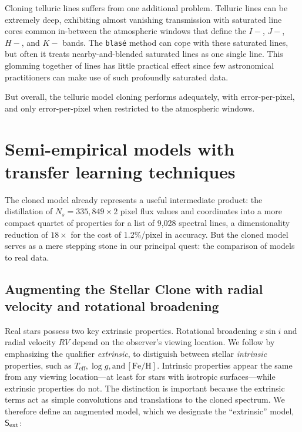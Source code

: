 \documentclass[modern]{aastex631}
\begin{document}
Cloning telluric lines suffers from one additional problem.  Telluric lines can be extremely deep, exhibiting almost vanishing transmission with saturated line cores common in-between the atmospheric windows that define the $I-$, $J-$, $H-$, and $K-$ bands.  The \texttt{blas\'e} method can cope with these saturated lines, but often it treats nearby-and-blended saturated lines as one single line.  This glomming together of lines has little practical effect since few astronomical practitioners can make use of such profoundly saturated data.

But overall, the telluric model cloning performs adequately, with  error-per-pixel, and only  error-per-pixel when restricted to the atmospheric windows.


\section{Semi-empirical models with transfer learning techniques}\label{transferLearn}


The cloned model already represents a useful intermediate product: the distillation of $N_s=335,849\times2$ pixel flux values and coordinates into a more compact quartet of properties for a list of 9,028 spectral lines, a dimensionality reduction of $18\times$ for the cost of 1.2\%/pixel in accuracy.  But the cloned model serves as a mere stepping stone in our principal quest: the comparison of models to real data.

\subsection{Augmenting the Stellar Clone with radial velocity and rotational broadening }
Real stars possess two key extrinsic properties.  Rotational broadening $v\sin{i}$ and radial velocity $RV$ depend on the observer's viewing location. We follow \citet{czekala15} by emphasizing the qualifier \emph{extrinsic}, to distiguish between stellar \emph{intrinsic} properties, such as $T_{\mathrm{eff}}, \log{g},\mathrm{and\,} [\mathrm{Fe}/\mathrm{H}]$.  Intrinsic properties appear the same from any viewing location---at least for stars with isotropic surfaces---while extrinsic properties do not.  The distinction is important because the extrinsic terms act as simple convolutions and translations to the cloned spectrum.  We therefore define an augmented model, which we designate the ``extrinsic'' model, $\mathsf{S}_{\rm ext}$:
\end{document}
